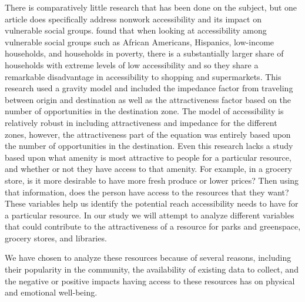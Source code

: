 \documentclass[3p, authoryear]{elsarticle} %
\begin{document}
There is comparatively little research that has been done on the subject, but
one article does specifically address nonwork accessibility and its impact on
vulnerable social groups. \citet{grengs2015nonwork} found that when looking at
accessibility among vulnerable social groups such as African Americans,
Hispanics, low-income households, and households in poverty, there is a
substantially larger share of households with extreme levels of low
accessibility and so they share a remarkable disadvantage in accessibility to
shopping and supermarkets. This research used a gravity model and included the
impedance factor from traveling between origin and destination as well as the
attractiveness factor based on the number of opportunities in the destination
zone. The model of accessibility is relatively robust in including
attractiveness and impedance for the different zones, however, the
attractiveness part of the equation was entirely based upon the number of
opportunities in the destination. Even this research lacks a study based upon
what amenity is most attractive to people for a particular resource, and whether
or not they have access to that amenity. For example, in a grocery store, is it
more desirable to have more fresh produce or lower prices? Then using that
information, does the person have access to the resources that they want? These
variables help us identify the potential reach accessibility needs to have for a
particular resource. In our study we will attempt to analyze different variables
that could contribute to the attractiveness of a resource for parks and
greenspace, grocery stores, and libraries.

We have chosen to analyze these resources because of several reasons, including
their popularity in the community, the availability of existing data to collect,
and the negative or positive impacts having access to these resources has on
physical and emotional well-being.
\end{document}
